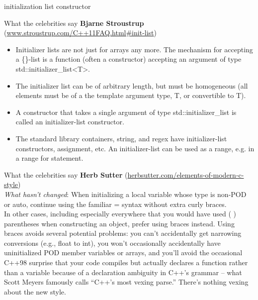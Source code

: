 \documentclass[11pt]{beamer}
\begin{document}
\begin{frame}{initialization list constructor}

\end{frame}

\begin{frame}{What the celebrities say}
\textbf{Bjarne Stroustrup} (\href{http://www.stroustrup.com/C++11FAQ.html\#init-list}{www.stroustrup.com/C++11FAQ.html\#init-list})
\begin{itemize}
\item Initializer lists are not just for arrays any more. The mechanism for accepting a \{\}-list is a function (often a constructor) accepting an argument of type std::initializer\_list\textless T\textgreater .\\
\pause
\item The initializer list can be of arbitrary length, but must be homogeneous (all elements must be of a the template argument type, T, or convertible to T).\\
\pause
\item A constructor that takes a single argument of type std::initializer\_list is called an initializer-list constructor.\\
\pause
\item The standard library containers, string, and regex have initializer-list constructors, assignment, etc. An initializer-list can be used as a range, e.g. in a range for statement.
\end{itemize}
\end{frame}

\begin{frame}{What the celebrities say}
\textbf{Herb Sutter} (\href{http://herbsutter.com/elements-of-modern-c-style}{herbsutter.com/elements-of-modern-c-style})\\

\emph{What hasn’t changed}: When initializing a local variable whose type is non-POD or auto, continue using the familiar = syntax without extra curly braces.\\
\pause
In other cases, including especially everywhere that you would have used ( ) parentheses when constructing an object, prefer using { } braces instead. Using braces avoids several potential problems: you can’t accidentally get narrowing conversions (e.g., float to int), you won’t occasionally accidentally have uninitialized POD member variables or arrays, and you’ll avoid the occasional C++98 surprise that your code compiles but actually declares a function rather than a variable because of a declaration ambiguity in C++’s grammar – what Scott Meyers famously calls “C++’s most vexing parse.” There’s nothing vexing about the new style.
\end{frame}
\end{document}
